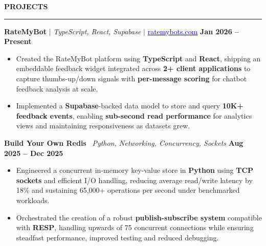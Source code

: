 \documentclass{article}
\begin{document}
\vspace{3mm}
\noindent \textbf{{PROJECTS}} \vspace{-8pt} \\
\rule{\linewidth}{0.5pt}

{\large \noindent \textbf{RateMyBot} $\mid$ \textit{TypeScript, React, Supabase} $\mid$ \href{https://ratemybots.com}{\textcolor{blue}{ratemybots.com}}} \hfill \textbf{Jan 2026 – Present}

\vspace{1mm}

{\small
\begin{itemize}[noitemsep, nolistsep, leftmargin=*, itemsep=1mm]

\item Created the RateMyBot platform using \textbf{TypeScript} and \textbf{React}, shipping an embeddable feedback widget integrated across \textbf{2+ client applications} to capture thumbs-up/down signals with \textbf{per-message scoring} for chatbot feedback analysis at scale.

\item Implemented a \textbf{Supabase}-backed data model to store and query \textbf{10K+ feedback events}, enabling \textbf{sub-second read performance} for analytics views and maintaining responsiveness as datasets grew.

\end{itemize}
}

\vspace{2mm}

{\large \noindent \textbf{Build Your Own Redis} \textbar\ \textit{Python, Networking, Concurrency, Sockets}} \hfill \textbf{Aug 2025 – Dec 2025}
\vspace{1mm}

{\small
\begin{itemize}[noitemsep, nolistsep, leftmargin=*, itemsep=1mm]

\item Engineered a concurrent in-memory key-value store in \textbf{Python} using \textbf{TCP sockets} and efficient I/O handling, reducing average read/write latency by 18\% and sustaining 65,000+ operations per second under benchmarked workloads.

\item Orchestrated the creation of a robust \textbf{publish-subscribe system} compatible with \textbf{RESP}, handling upwards of 75 concurrent connections while ensuring steadfast performance, improved testing and reduced debugging.

\end{itemize}
}
\end{document}
